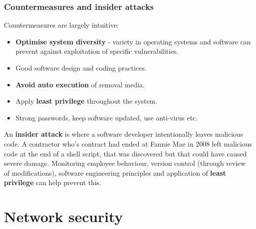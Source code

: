 \documentclass{article}
\begin{document}
\subsubsection{Countermeasures and insider attacks}
Countermeasures are largely intuitive:
\begin{itemize}
	\item \textbf{Optimise system diversity} - variety in operating systems and software can prevent against exploitation of specific vulnerabilities.
	\item Good software design and coding practices.
	\item \textbf{Avoid auto execution} of removal media.
	\item Apply \textbf{least privilege} throughout the system.
	\item Strong passwords, keep software updated, use anti-virus etc.
\end{itemize}
An \textbf{insider attack} is where a software developer intentionally leaves malicious code. A contractor who's contract had ended at Fannie Mae in 2008 left malicious code at the end of a shell script, that was discovered but that could have caused severe damage. Monitoring employee behaviour, version control (through review of modifications), software engineering principles and application of \textbf{least privilege} can help prevent this.

\section{Network security}
\end{document}
